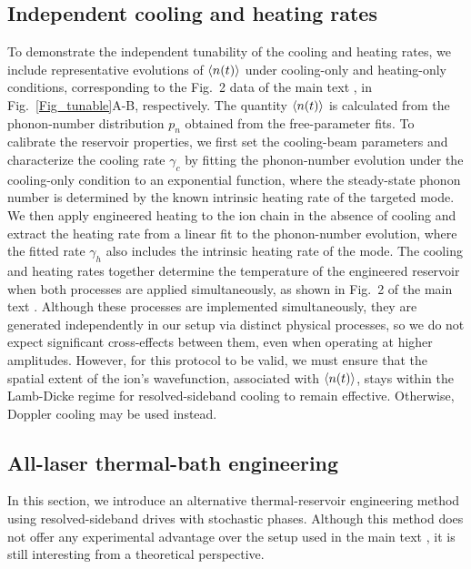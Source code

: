 \documentclass[%
reprint,
superscriptaddress,
amsmath,amssymb,
aps,
prl,
floatfix,
]{revtex4-2}
\begin{document}
\subsection*{Independent cooling and heating rates} \label{app_tune}
To demonstrate the independent tunability of the cooling and heating rates, we include representative evolutions of $\braket{n(t)}$ under cooling-only and heating-only conditions, corresponding to the Fig.~2 data of the main text \cite{so2025fT}, in Fig.~\ref{Fig_tunable}A-B, respectively. The quantity $\braket{n(t)}$ is calculated from the phonon-number distribution $p_n$ obtained from the free-parameter fits. To calibrate the reservoir properties, we first set the cooling-beam parameters and characterize the cooling rate $\gamma_c$ by fitting the phonon-number evolution under the cooling-only condition to an exponential function, where the steady-state phonon number is determined by the known intrinsic heating rate of the targeted mode. We then apply engineered heating to the ion chain in the absence of cooling and extract the heating rate from a linear fit to the phonon-number evolution, where the fitted rate $\gamma_h$ also includes the intrinsic heating rate of the mode. The cooling and heating rates together determine the temperature of the engineered reservoir when both processes are applied simultaneously, as shown in Fig.~2 of the main text \cite{so2025fT}. Although these processes are implemented simultaneously, they are generated independently in our setup via distinct physical processes, so we do not expect significant cross-effects between them, even when operating at higher amplitudes. However, for this protocol to be valid, we must ensure that the spatial extent of the ion's wavefunction, associated with $\braket{n(t)}$, stays within the Lamb-Dicke regime for resolved-sideband cooling to remain effective. Otherwise, Doppler cooling may be used instead.

\subsection*{All-laser thermal-bath engineering} \label{app_alllaser}
In this section, we introduce an alternative thermal-reservoir engineering method using resolved-sideband drives with stochastic phases. Although this method does not offer any experimental advantage over the setup used in the main text \cite{so2025fT}, it is still interesting from a theoretical perspective. 
\end{document}
